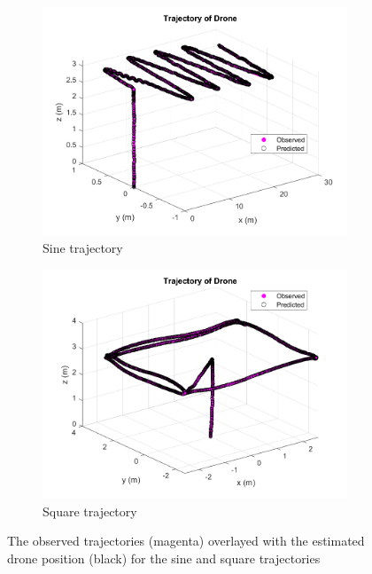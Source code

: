\documentclass[letterpaper, paper,11pt]{AAS}	%
\begin{document}
\begin{figure}[H]
\centering
\begin{subfigure}{.5\textwidth}
	\centering
	\includegraphics[width=\textwidth]{Figures/sine1_traj}
	\caption{Sine trajectory}
	\label{fig:sine1_traj}
\end{subfigure}%
\begin{subfigure}{.5\textwidth}
	\centering
	\includegraphics[width=\textwidth]{Figures/square1_traj}
	\caption{Square trajectory}
	\label{fig:square1_traj}
\end{subfigure}
\caption{The observed trajectories (magenta) overlayed with the estimated drone position (black) for the sine and square trajectories}
\label{fig:Overlay2}
\end{figure}
\end{document}
